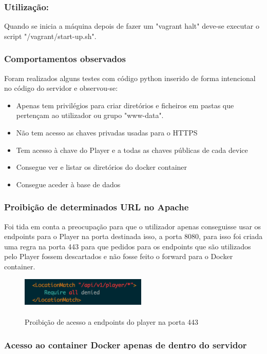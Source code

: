 \documentclass[pdftex,12pt,a4paper]{report}
\begin{document}
\subsubsection{Utilização:}
Quando se inicia a máquina depois de fazer um "vagrant halt" deve-se executar o script "/vagrant/start-up.sh". 

\subsubsection{Comportamentos observados}
Foram realizados alguns testes com código python inserido de forma intencional no código do servidor e observou-se:

\begin{itemize}
\item Apenas tem privilégios para criar diretórios e ficheiros em pastas que pertençam ao utilizador ou grupo "www-data".
\item Não tem acesso as chaves privadas usadas para o HTTPS
\item Tem acesso à chave do Player e a todas as chaves públicas de cada device
\item Consegue ver e listar os diretórios do docker container
\item Consegue aceder à base de dados
\end{itemize}

\subsubsection{Proibição de determinados URL no Apache}

Foi tida em conta a preocupação para que o utilizador apenas conseguisse usar os endpoints para o Player na porta destinada isso, a porta 8080, para isso foi criada uma regra na porta 443 para que pedidos para os endpoints que são utilizados pelo Player fossem descartados e não fosse feito o forward para o Docker container.

\begin{figure}[!htb]
\center
 \includegraphics[width=60mm,scale=1]{player_denied.png}
 \caption{\\Proibição de acesso a endpoints do player na porta 443}
 \label{fig:docker_c}
\end{figure}

\subsubsection{Acesso ao container Docker apenas de dentro do servidor}
\end{document}
